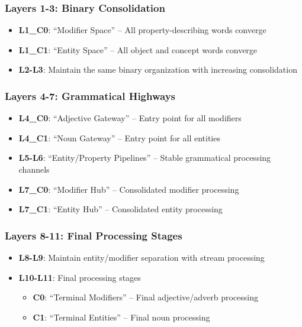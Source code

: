 \subsubsection{Layers 1-3: Binary Consolidation}
\begin{itemize}
    \item \textbf{L1\_C0}: ``Modifier Space'' -- All property-describing words converge
    \item \textbf{L1\_C1}: ``Entity Space'' -- All object and concept words converge
    \item \textbf{L2-L3}: Maintain the same binary organization with increasing consolidation
\end{itemize}

\subsubsection{Layers 4-7: Grammatical Highways}
\begin{itemize}
    \item \textbf{L4\_C0}: ``Adjective Gateway'' -- Entry point for all modifiers
    \item \textbf{L4\_C1}: ``Noun Gateway'' -- Entry point for all entities
    \item \textbf{L5-L6}: ``Entity/Property Pipelines'' -- Stable grammatical processing channels
    \item \textbf{L7\_C0}: ``Modifier Hub'' -- Consolidated modifier processing
    \item \textbf{L7\_C1}: ``Entity Hub'' -- Consolidated entity processing
\end{itemize}

\subsubsection{Layers 8-11: Final Processing Stages}
\begin{itemize}
    \item \textbf{L8-L9}: Maintain entity/modifier separation with stream processing
    \item \textbf{L10-L11}: Final processing stages
    \begin{itemize}
        \item \textbf{C0}: ``Terminal Modifiers'' -- Final adjective/adverb processing
        \item \textbf{C1}: ``Terminal Entities'' -- Final noun processing
    \end{itemize}
\end{itemize}

